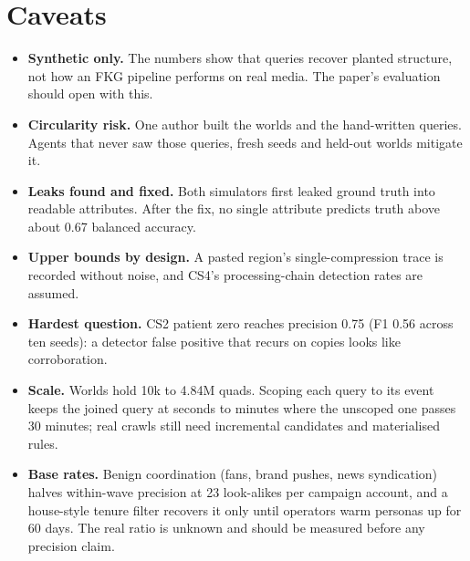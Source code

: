 \documentclass[11pt]{article}
\begin{document}
\section*{Caveats}
\begin{itemize}
\item \textbf{Synthetic only.} The numbers show that queries recover planted structure, not how an FKG pipeline performs on real media. The paper's evaluation should open with this.
\item \textbf{Circularity risk.} One author built the worlds and the hand-written queries. Agents that never saw those queries, fresh seeds and held-out worlds mitigate it.
\item \textbf{Leaks found and fixed.} Both simulators first leaked ground truth into readable attributes. After the fix, no single attribute predicts truth above about 0.67 balanced accuracy.
\item \textbf{Upper bounds by design.} A pasted region's single-compression trace is recorded without noise, and CS4's processing-chain detection rates are assumed.
\item \textbf{Hardest question.} CS2 patient zero reaches precision 0.75 (F1 0.56 across ten seeds): a detector false positive that recurs on copies looks like corroboration.
\item \textbf{Scale.} Worlds hold 10k to 4.84M quads. Scoping each query to its event keeps the joined query at seconds to minutes where the unscoped one passes 30 minutes; real crawls still need incremental candidates and materialised rules.
\item \textbf{Base rates.} Benign coordination (fans, brand pushes, news syndication) halves within-wave precision at 23 look-alikes per campaign account, and a house-style tenure filter recovers it only until operators warm personas up for 60 days. The real ratio is unknown and should be measured before any precision claim.
\end{itemize}
\end{document}
